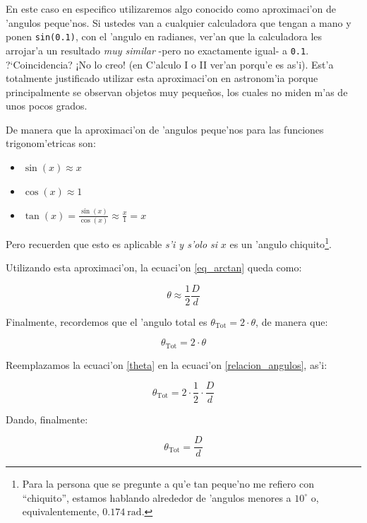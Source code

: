 \documentclass{article}
\begin{document}
\begin{enumerate} [a)]
En este caso en especifico utilizaremos algo conocido como aproximaci'on de 'angulos peque'nos. Si ustedes van a cualquier calculadora que tengan a mano y ponen \texttt{sin(0.1)}, con el 'angulo en radianes, ver'an que la calculadora les arrojar'a un resultado \emph{muy similar} -pero no exactamente igual-  a \texttt{0.1}. ?`Coincidencia? ¡No lo creo! (en C'alculo I o II ver'an porqu'e es as'i). 
Est'a totalmente justificado utilizar esta aproximaci'on en astronom'ia porque principalmente se observan objetos muy pequeños, los cuales no miden m'as de unos pocos grados. 

De manera que la aproximaci'on de 'angulos peque'nos para las funciones trigonom'etricas son:

\begin{itemize}
\item $\sin (x) \approx x$
\item $\cos (x) \approx 1$
\item $\tan (x) = \frac{\sin (x)}{ \cos (x)} \approx \frac{x}{1} = x$
\end{itemize}

Pero recuerden que esto es aplicable \emph{s'i y s'olo si} $x$ es un 'angulo chiquito\footnote{Para la persona que se pregunte a qu'e tan peque'no me refiero con ``chiquito'', estamos hablando alrededor de 'angulos menores a $10^\circ$ o, equivalentemente, $0.174 \ \text{rad}$.}.

Utilizando esta aproximaci'on, la ecuaci'on \eqref{eq_arctan} queda como:

\begin{equation} \label{theta}
\theta \approx \frac{1}{2} \frac{D}{d}
\end{equation}

Finalmente, recordemos que el 'angulo total es $\theta_{\text{Tot}} = 2 \cdot \theta$, de manera que:

\begin{equation}\label{relacion_angulos}
\theta_{\text{Tot}} = 2 \cdot \theta
\end{equation}

Reemplazamos la ecuaci'on \eqref{theta} en la ecuaci'on \eqref{relacion_angulos}, as'i:

\begin{equation*}
\theta_{\text{Tot}} = 2 \cdot \frac{1}{2} \cdot \frac{D}{d}
\end{equation*}

Dando, finalmente:

\begin{equation} \label{angular_size}
\theta_{\text{Tot}} = \frac{D}{d}
\end{equation}


\end{enumerate}
\end{document}
